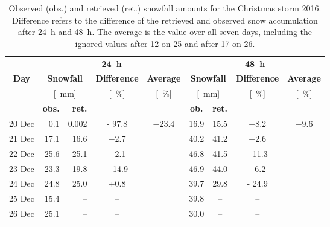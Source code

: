 \begin{table}[H]
	\begin{center}
		\caption{Observed (obs.) and retrieved (ret.) snowfall amounts for the Christmas storm 2016. Difference refers to the difference of the retrieved and observed snow accumulation after \SI{24}{\hour} and \SI{48}{\hour}. The average is the value over all seven days, including the ignored values after \SI{12}{\UTC} on \SI{25}{\dec} and after \SI{17}{\UTC} on \SI{26}{\dec}.}\label{tab:res:ret_error}
		\begin{tabular}{c||r|r|c|c||c|c|c|c}
			\hline \hline
			& \multicolumn{4}{c||}{\textbf{\SI{24}{\hour}}} & \multicolumn{4}{c}{\textbf{\SI{48}{\hour}}}   \\ \cline{2-9}
			\textbf{Day} & \multicolumn{2}{c|}{\textbf{Snowfall}} & \textbf{Difference} & \textbf{Average} &  \multicolumn{2}{c|}{\textbf{Snowfall}} & \textbf{Difference} & \textbf{Average}  \\\cline{2-9}
			& \multicolumn{2}{c|}{[\SI{}{\mm}]} & [\SI{}{\percent}] & [\SI{}{\percent}] & \multicolumn{2}{c|}{[\SI{}{\mm}]} & [\SI{}{\percent}] & [\SI{}{\percent}] \\ \cline{2-3} \cline{6-7}
			& \textbf{obs.} & \textbf{ret.} &  & & \textbf{ob.} & \textbf{ret.} & & \\\hline\hline
			\num{20} Dec & \num{0.1} & \num{0.002} & \num{- 97.8} & \multirow{8}{*}{  \num{-23.4}} & \num{16.9} &\num{15.5} & \num{-8.2} & \multirow{8}{*}{\num{-9.6}} \\\cline{1-4}\cline{6-8}
			\num{21} Dec & \num{17.1} & \num{16.6} & \num{-2.7} &  & \num{40.2} & \num{41.2} & +\num{2.6} & \\\cline{1-4}\cline{6-8}
			\num{22} Dec & \num{25.6} &\num{25.1} & \num{-2.1} &  & \num{46.8}& \num{41.5} & \num{- 11.3} & \\\cline{1-4}\cline{6-8}
			\num{23} Dec & \num{23.3}& \num{19.8} & \num{-14.9} &  & \num{46.9} &\num{44.0} & \num{- 6.2} & \\\cline{1-4}\cline{6-8}
			\num{24} Dec & \num{24.8} & \num{25.0} & +\num{0.8} &  & \num{39.7} & \num{29.8} & \num{- 24.9} & \\\cline{1-4}\cline{6-8}
			\num{25} Dec & \num{15.4}& -- & -- &  &  \num{39.8} & -- & --\\\cline{1-4}\cline{6-8}
			\num{26} Dec & \num{25.1} &-- & -- &  & \num{30.0} &-- & -- & \\\hline\hline
		\end{tabular}
	\end{center}
\end{table}
